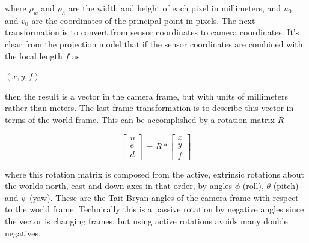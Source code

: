  where $\rho_w$ and $\rho_h$ are the width and height of each pixel in millimeters, and $u_0$ and $v_0$ are the coordinates of the principal point in pixels.   The next transformation is to convert from sensor coordinates to camera coordinates.  It's clear from the projection model that if the sensor coordinates are combined with the focal length $f$ as
 \begin{center}
 $(x,y,f)$
 \end{center}
 then the result is a vector in the camera frame, but with units of millimeters rather than meters. The last frame transformation is to describe this vector in terms of the world frame.  This can be accomplished by a rotation matrix $R$
 
 \begin{equation}
 \label{rotation_eq}
 \begin{bmatrix} n \\ e \\ d \end{bmatrix}
 =
 R *
 \begin{bmatrix} x \\ y \\ f \end{bmatrix}
 \end{equation}

 where this rotation matrix is composed from the active, extrinsic rotations about the worlds north, east and down axes in that order, by angles $\phi$ (roll), $\theta$ (pitch) and $\psi$ (yaw).  These are the Tait-Bryan angles of the camera frame with respect to the world frame.  Technically this is a passive rotation by negative angles since the vector is changing frames, but using active rotations avoids many double negatives.
 
